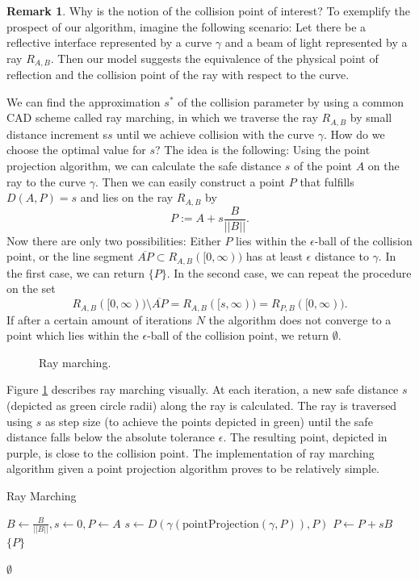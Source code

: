 \documentclass[a4paper, 11pt]{report}
\theoremstyle{definition}
\newtheorem*{remark}{Remark}
\begin{document}
	\begin{remark}
		Why is the notion of the collision point of interest? To exemplify the prospect of our algorithm, imagine the following scenario: Let there be a reflective interface represented by a curve $\gamma$ and a beam of light represented by a ray $R_{A,B}$. Then our model suggests the equivalence of the physical point of reflection and the collision point of the ray with respect to the curve.
	\end{remark}

	We can find the approximation $s^*$ of the collision parameter by using a common CAD scheme called ray marching, in which we traverse the ray $R_{A,B}$ by small distance increment s$s$ until we achieve collision with the curve $\gamma$. How do we choose the optimal value for $s$? The idea is the following: Using the point projection algorithm, we can calculate the safe distance $s$ of the point $A$ on the ray to the curve $\gamma$. Then we can easily construct a point $P$ that fulfills $D(A,P) = s$ and lies on the ray $R_{A,B}$ by 
		$$ P := A+s\frac{B}{||B||}.$$
	Now there are only two possibilities: Either $P$ lies within the $\epsilon$-ball of the collision point, or the line segment $\overline{AP} \subset R_{A,B}([0,\infty))$ has at least $\epsilon$ distance to $\gamma$. In the first case, we can return $\{P\}$. In the second case, we can repeat the procedure on the set 
		$$ R_{A,B}([0,\infty)) \setminus \overline{AP} = R_{A,B}([s,\infty)) = R_{P,B}([0,\infty)).$$
	If after a certain amount of iterations $N$ the algorithm does not converge to a point which lies within the $\epsilon$-ball of the collision point, we return $\emptyset$.

	\begin{figure}[H]
		\centering
		
		\caption{Ray marching.}
		\label{fig:raymarchingvis}
	\end{figure}

	Figure \ref{fig:raymarchingvis} describes ray marching visually. At each iteration, a new safe distance $s$ (depicted as green circle radii) along the ray is calculated. The ray is traversed using $s$ as step size (to achieve the points depicted in green) until the safe distance falls below the absolute tolerance $\epsilon$. The resulting point, depicted in purple, is close to the collision point. The implementation of ray marching algorithm given a point projection algorithm proves to be relatively simple.

	\begin{algorithm}[H]
		\begin{algorithmic}[1]

			\caption{Ray Marching}\label{alg:raymarching}
				\State $B \gets \frac{B}{||B||}, s \gets 0, P \gets A$
					\State $s \gets D(\gamma(\text{pointProjection}(\gamma, P)), P)$
					\State $P \gets P + sB$
						\State \Return $\{P\}$
					\EndIf
				\EndFor

				\State \Return $\emptyset$
			\EndProcedure
		\end{algorithmic}
	\end{algorithm}
\end{document}
